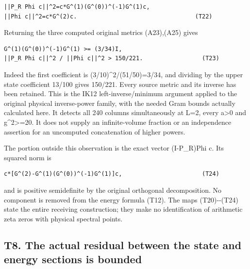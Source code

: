 \documentclass[11pt,a4paper]{article}
\renewcommand{\[}{\begingroup\small\originaldisplaystart}
\renewcommand{\]}{\originaldisplayend\endgroup}
\begin{document}
\begin{verbatim}
||P_R Phi c||^2=c*G^(1)(G^(0))^(-1)G^(1)c,
||Phi c||^2=c*G^(2)c.                                  (T22)
\end{verbatim}

Returning the three computed original metrics (A23),(A25) gives

\begin{verbatim}
G^(1)(G^(0))^(-1)G^(1) >= (3/34)I,
||P_R Phi c||^2 / ||Phi c||^2 > 150/221.                 (T23)
\end{verbatim}

Indeed the first coefficient is
{(\allowbreak{}3\allowbreak{}/\allowbreak{}1\allowbreak{}0\allowbreak{})\allowbreak{}\textasciicircum{}\allowbreak{}2\allowbreak{}/\allowbreak{}(\allowbreak{}5\allowbreak{}1\allowbreak{}/\allowbreak{}5\allowbreak{}0\allowbreak{})\allowbreak{}=\allowbreak{}3\allowbreak{}/\allowbreak{}3\allowbreak{}4\allowbreak{},\allowbreak{}}
and dividing by the upper state coefficient 13/100 gives 150/221. Every
source metric and its inverse has been retained. This is the IK12
{l\allowbreak{}e\allowbreak{}f\allowbreak{}t\allowbreak{}-\allowbreak{}i\allowbreak{}n\allowbreak{}v\allowbreak{}e\allowbreak{}r\allowbreak{}s\allowbreak{}e\allowbreak{}/\allowbreak{}m\allowbreak{}i\allowbreak{}n\allowbreak{}i\allowbreak{}m\allowbreak{}u\allowbreak{}m\allowbreak{}}
argument applied to the original physical inverse-power family, with the
needed Gram bounds actually calculated here. It detects all 240 columns
simultaneously at L=2, every a\textgreater0 and g\^{}2\textgreater=20.
It does not supply an infinite-volume fraction or an independence
assertion for an uncomputed concatenation of higher powers.

The portion outside this observation is the exact vector (I-P\_R)Phi c.
Its squared norm is

\begin{verbatim}
c*[G^(2)-G^(1)(G^(0))^(-1)G^(1)]c,                       (T24)
\end{verbatim}

and is positive semidefinite by the original orthogonal decomposition.
No component is removed from the energy formula (T12). The maps
(T20)-\/-(T24) state the entire receiving construction; they make no
identification of arithmetic zeta zeros with physical spectral points.

\subsection{T8. The actual residual between the state and energy
sections is
bounded}\label{t8.-the-actual-residual-between-the-state-and-energy-sections-is-bounded}
\end{document}
